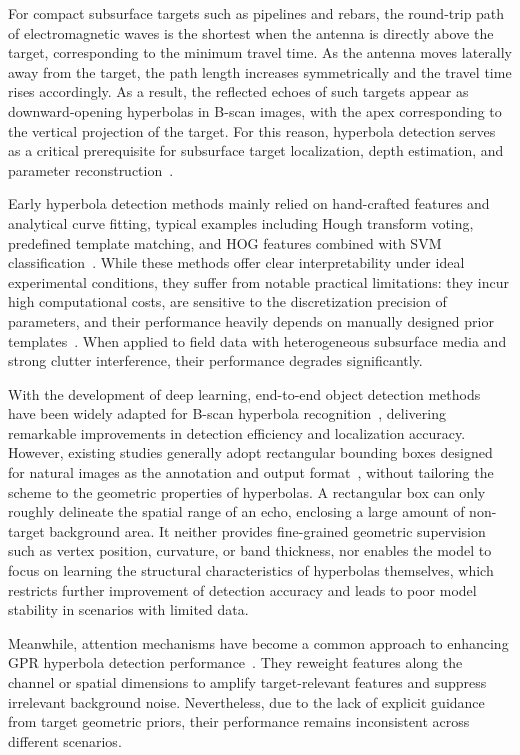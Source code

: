 \documentclass[lettersize,journal]{IEEEtran}
\begin{document}
For compact subsurface targets such as pipelines and rebars, 
the round-trip path of electromagnetic waves is the shortest when the antenna is directly above the target, 
corresponding to the minimum travel time. 
As the antenna moves laterally away from the target, 
the path length increases symmetrically and the travel time rises accordingly. 
As a result, the reflected echoes of such targets appear as downward-opening hyperbolas in B-scan images, 
with the apex corresponding to the vertical projection of the target. 
For this reason, hyperbola detection serves as a critical prerequisite for subsurface target localization, 
depth estimation, and parameter reconstruction~\cite{tong2020survey}.

Early hyperbola detection methods mainly relied on hand-crafted features and analytical curve fitting, 
typical examples including Hough transform voting, predefined template matching, 
and HOG features combined with SVM classification~\cite{travassos2021review}. 
While these methods offer clear interpretability under ideal experimental conditions, 
they suffer from notable practical limitations: they incur high computational costs, 
are sensitive to the discretization precision of parameters, 
and their performance heavily depends on manually designed prior templates~\cite{tong2020survey}. 
When applied to field data with heterogeneous subsurface media and strong clutter interference, 
their performance degrades significantly.

With the development of deep learning, 
end-to-end object detection methods have been widely adapted for 
B-scan hyperbola recognition~\cite{besaw2015deep,redmon2016yolo,redmon2018yolov3,bochkovskiy2020yolov4}, 
delivering remarkable improvements in detection efficiency and localization accuracy. 
However, existing studies generally adopt rectangular bounding boxes designed for natural images as the annotation and output format~\cite{redmon2016yolo}, 
without tailoring the scheme to the geometric properties of hyperbolas. 
A rectangular box can only roughly delineate the spatial range of an echo, 
enclosing a large amount of non-target background area. 
It neither provides fine-grained geometric supervision such as vertex position, curvature, or band thickness, 
nor enables the model to focus on learning the structural characteristics of hyperbolas themselves, 
which restricts further improvement of detection accuracy and leads to poor model stability in scenarios with limited data.

Meanwhile, attention mechanisms have become a common approach to enhancing GPR hyperbola detection performance~\cite{hu2018senet,woo2018cbam,wang2020eca,hou2021coordinate,vaswani2017attention,wang2018nonlocal}. 
They reweight features along the channel or spatial dimensions to amplify target-relevant features and suppress irrelevant background noise. 
Nevertheless, due to the lack of explicit guidance from target geometric priors, 
their performance remains inconsistent across different scenarios.
\end{document}
